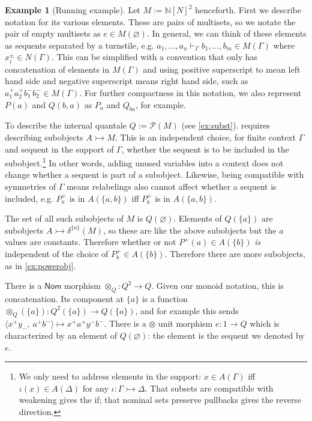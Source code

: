 \documentclass{article}
\theoremstyle{definition}
\newtheorem{example}{Example}[section]
\newcommand{\N}{\mathbb{N}}
\newcommand{\cP}{\mathcal{P}}
\newcommand{\cat}[1]{\mathsf{#1}}
\newcommand{\Nom}{\cat{Nom}}
\begin{document}
\begin{example}[Running example]
    Let $M:=\N[{N}]^2$ henceforth. First we describe notation for its various elements. 
    These are pairs of multisets, so we notate the pair of empty multisets as $e \in M(\varnothing)$. 
    In general, we can think of these elements as sequents separated by a turnstile, e.g. $a_1,...,a_n \vdash_\Gamma b_1,...,b_m \in M(\Gamma)$ where $x^\pm_i\in {N}(\Gamma)$. 
    This can be simplified with a convention that only has concatenation of elements in $M(\Gamma)$ and using positive superscript to mean left hand side and negative superscript means right hand side, such as $a^+_1a^+_2b^-_1b^-_2 \in M(\Gamma)$. 
    For further compactness in this notation, we also represent $P(a)$ and $Q(b,a)$ as $P_a$ and $Q_{ba}$, for example.
    
    To describe the internal quantale $Q:=\cP(M)$ (see \cref{ex:subst}).
    requires describing subobjects $A\rightarrowtail M$. 
    This is an independent choice, for finite context $\Gamma$ and sequent in the support of $\Gamma$, whether the sequent is to be included in the subobject.\footnote{
    We only need to address elements in the support: $x \in A(\Gamma)$ iff $\iota(x)\in A(\Delta)$ for any $\iota\colon \Gamma\rightarrowtail \Delta$. That subsets are compatible with weakening gives the if; that nominal sets preserve pullbacks gives the reverse direction.} 
    In other words, adding unused variables into a context does not change whether a sequent is part of a subobject. 
    Likewise, being compatible with symmetries of $\Gamma$ means relabelings also cannot affect whether a sequent is included, e.g. $P^+_a$ is in $A(\{a,b\})$ iff $P^+_b$ is in $A(\{a,b\})$. 
    
    The set of all such subobjects of $M$ is $Q(\varnothing)$. 
    Elements of $Q(\{a\})$ are subobjects $A\rightarrowtail \delta^{\{a\}}(M)$, so these are like the above subobjects but the $a$ values are constants. 
    Therefore whether or not $P^+(a) \in A(\{b\})$ {\it is} independent of the choice of $P^+_b\in A(\{b\})$. 
    Therefore there are more subobjects, as in \cref{ex:powerobj}.
    
    There is a $\Nom$ morphism $\otimes_Q\colon Q^2\to Q$. Given our monoid notation, this is concatenation. 
    Its component at $\{a\}$ is a function $\otimes_Q(\{a\})\colon Q^2(\{a\})\to Q(\{a\})$, and for example this sends $\langle x^+y_-,\ a^+b^-\rangle \mapsto  x^+a^+y^-b^-$. 
    There is a $\otimes$ unit morphism $e\colon 1 \to Q$ which is characterized by an element of $Q(\varnothing)$: the element is the sequent we denoted by $e$.
\end{example}
\end{document}
